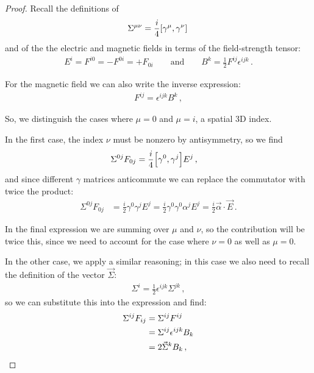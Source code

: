\documentclass[main.tex]{subfiles}
\begin{document}
\begin{proof}
Recall the definitions of 
%
\begin{align}
\Sigma^{\mu \nu } = \frac{i}{4} \qty[\gamma^{\mu }, \gamma^{\nu }]
\,
\end{align}
%
and of the the electric and magnetic fields in terms of the field-strength tensor: 
%
\begin{align}
E^{i} = F^{i0} = - F^{0i} = +F_{0i}
\qquad \text{and} \qquad
B^{k} = \frac{1}{2} F^{ij} \epsilon^{ijk}
\,.
\end{align}

For the magnetic field we can also write the inverse expression: 
%
\begin{align}
F^{ij} = \epsilon^{ijk} B^{k}
\,,
\end{align}
%


So, we distinguish the cases where \(\mu = 0\) and \(\mu = i\), a spatial 3D index.

In the first case, the index \(\nu \) must be nonzero by antisymmetry, so we find
%
\begin{align}
\Sigma^{0j}F_{0j} &= \frac{i}{4} \qty[\gamma^{0}, \gamma^{j}] E^{j}
\,,
\end{align}
%
and since different \(\gamma \) matrices anticommute we can replace the commutator with twice the product: 
%
\begin{align}
\Sigma^{0j} F_{0j} &= \frac{i}{2} \gamma^{0} \gamma^{j} E^{j} = \frac{i}{2} \gamma^{0} \gamma^{0} \alpha^{j} E^{j} = \frac{i}{2} \vec{\alpha} \cdot \vec{E}
\,.
\end{align}

In the final expression we are summing over \(\mu \) and \(\nu \), so the contribution will be twice this, since we need to account for the case where \(\nu =0\) as well as \(\mu =0 \).

In the other case, we apply a similar reasoning; in this case we also need to recall the definition of the vector \(\vec{\Sigma}\): 
%
\begin{align}
\Sigma^{i} = \frac{1}{2} \epsilon^{ijk} \Sigma^{jk}
\,,
\end{align}
%
so we can substitute this into the expression and find:
%
\begin{subequations}
\begin{align}
\Sigma^{ij} F_{ij} &= \Sigma^{ij} F^{ij}  \\
&= \Sigma^{ij} \tensor{\epsilon }{^{ijk}} B_{k}  \\
&= 2 \vec{\Sigma}^{k} B_{k}
\,,
\end{align}
\end{subequations}
%
\end{proof}
\end{document}
